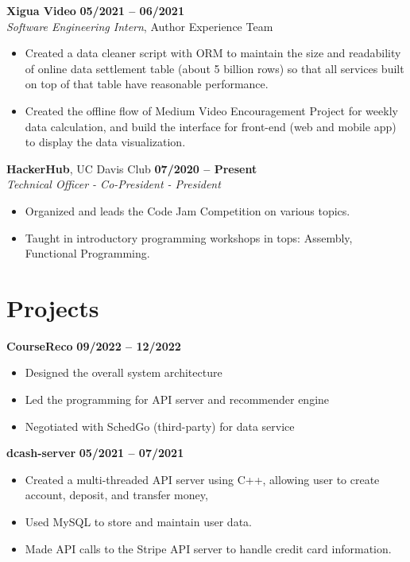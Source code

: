 \documentclass[margin,line]{res}
\begin{document}
\begin{resume}
{\bf Xigua Video} \hfill {\bf 05/2021 -- 06/2021} \\
\textit{Software Engineering Intern}, {Author Experience Team}
\begin{itemize}
	\item Created a data cleaner script with ORM to maintain the size and readability of online data settlement table (about 5 billion rows) so that all services built on top of that table have reasonable performance.
	\item Created the offline flow of Medium Video Encouragement Project for weekly data calculation, and build the interface for front-end (web and mobile app) to display the data visualization.
\end{itemize}
\vspace{-.3cm}

{\bf HackerHub}, UC Davis Club \hfill {\bf 07/2020 -- Present} \\
\textit{Technical Officer - Co-President - President}
\begin{itemize}
	\item Organized and leads the Code Jam Competition on various topics.
	\item Taught in introductory programming workshops in tops: Assembly, Functional Programming.
\end{itemize}
\vspace{-.3cm}

\section{\sc Projects}
{\bf CourseReco} \hfill {\bf 09/2022 -- 12/2022 } \\
\begin{itemize}
	\item Designed the overall system architecture
	\item Led the programming for API server and recommender engine
	\item Negotiated with SchedGo (third-party) for data service
\end{itemize}
\vspace{-.3cm}

{\bf dcash-server} \hfill {\bf 05/2021 -- 07/2021} \\
\begin{itemize}
	\item Created a multi-threaded API server using C++, allowing user to create account, deposit, and transfer money,
	\item Used MySQL to store and maintain user data.
	\item Made API calls to the Stripe API server to handle credit card information.
\end{itemize}
\vspace{-.3cm}



\end{resume}
\end{document}
